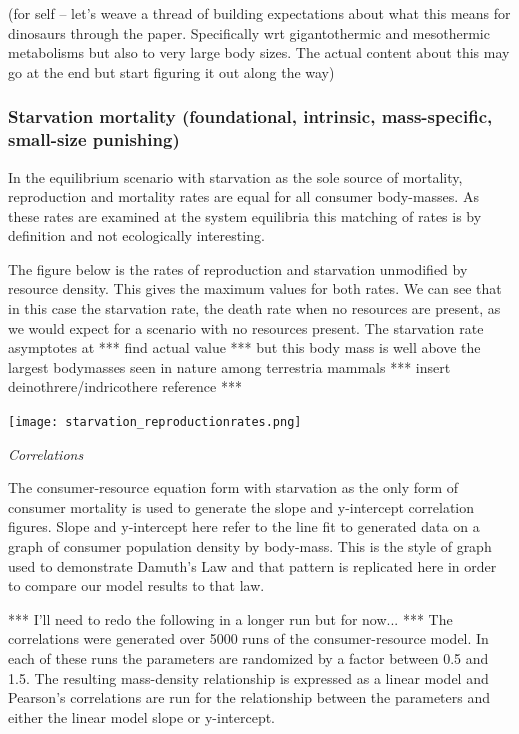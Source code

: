 \documentclass[]{rsos}%
\begin{document}
(for self – let’s weave a thread of building expectations about what this means for dinosaurs through the paper. Specifically wrt gigantothermic and mesothermic metabolisms but also to very large body sizes. The actual content about this may go at the end but start figuring it out along the way)

\subsubsection{Starvation mortality (foundational, intrinsic, mass-specific, small-size punishing)}

In the equilibrium scenario with starvation as the sole source of mortality, reproduction and mortality rates are equal for all consumer body-masses. As these rates are examined at the system equilibria this matching of rates is by definition and not ecologically interesting.


The figure below is the rates of reproduction and starvation unmodified by resource density. This gives the maximum values for both rates. We can see that in this case the starvation rate, the death rate when no resources are present, as we would expect for a scenario with no resources present. The starvation rate asymptotes at *** find actual value *** but this body mass is well above the largest bodymasses seen in nature among terrestria mammals *** insert deinothrere/indricothere reference *** \\

\vspace{0.5cm}

\texttt{[image: starvation\_reproductionrates.png]}\\

\vspace{0.5cm}

\emph{Correlations} 

The consumer-resource equation form with starvation as the only form of consumer mortality is used to generate the slope and y-intercept correlation figures. Slope and y-intercept here refer to the line fit to generated data on a graph of consumer population density by body-mass. This is the style of graph used to demonstrate Damuth’s Law and that pattern is replicated here in order to compare our model results to that law. 

*** I'll need to redo the following in a longer run but for now... ***
The correlations were generated over 5000 runs of the consumer-resource model. In each of these runs the parameters are randomized by a factor between 0.5 and 1.5. The resulting mass-density relationship is expressed as a linear model and Pearson’s correlations are run for the relationship between the parameters and either the linear model slope or y-intercept. \\
\end{document}
